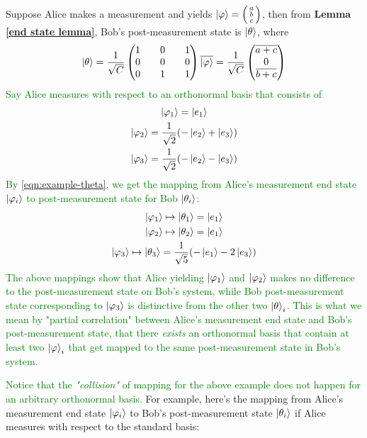 \begin{example}
Suppose Alice makes a measurement and yields $\ket{\varphi}=\left(\begin{smallmatrix}a\\b\\c\end{smallmatrix}\right)$, then from \textbf{Lemma \ref{end state lemma}}, Bob's post-measurement state is $\ket{\theta}$, where
\begin{equation} \label{eqn:example-theta}
\ket{\theta}=\frac{1}{\sqrt{C}}\begin{pmatrix}
1 && 0 && 1\\
0 && 0 && 0\\
0 && 1 && 1\\
\end{pmatrix}\overline{\ket{\varphi}}=\frac{1}{\sqrt{C}}\begin{pmatrix}
\overline{a+c}\\
0\\
\overline{b+c}
\end{pmatrix} 
\end{equation}
\textcolor{green}{
 Say Alice measures with respect to an orthonormal basis that consists of
    \begin{gather}
    \ket{\varphi_1}=\ket{e_1}\\ \ket{\varphi_2}=\frac{1}{\sqrt{2}}(-\ket{e_2}+\ket{e_3})\\
    \ket{\varphi_3}=\frac{1}{\sqrt{2}}(-\ket{e_2}-\ket{e_3})
    \end{gather}
By \eqref{eqn:example-theta}, we get the mapping from Alice's measurement end state $\ket{\varphi_i}$ to post-measurement state for Bob $\ket{\theta_i}$:
    \begin{gather}
        \ket{\varphi_1} \mapsto \ket{\theta_1}=\ket{e_1}\\
        \ket{\varphi_2} \mapsto \ket{\theta_2}=\ket{e_1}\\
        \ket{\varphi_3} \mapsto \ket{\theta_3}=\frac{1}{\sqrt{5}}(-\ket{e_1}-2\ket{e_3})
    \end{gather}
}
\textcolor{green}{The above mappings show that Alice yielding $\ket{\varphi_1}$ and $\ket{\varphi_2}$ makes no difference to the post-measurement state on Bob's system, while Bob post-measurement state corresponding to $\ket{\varphi_3}$ is distinctive from the other two $\ket{\theta}_i$. This is what we mean by "partial correlation" between Alice's measurement end state and Bob's post-measurement state, that there \emph{exists} an orthonormal basis that contain at least two $\ket{\varphi}_i$ that get mapped to the same post-measurement state in Bob's system.}
\end{example} 
\textcolor{green}{Notice that the \textit{"collision"} of mapping for the above example does not happen for an arbitrary orthonormal basis.} For example, here's the mapping from Alice's measurement end state $\ket{\varphi_i}$ to Bob's post-measurement state $\ket{\theta_i}$ if Alice measures with respect to the standard basis:
